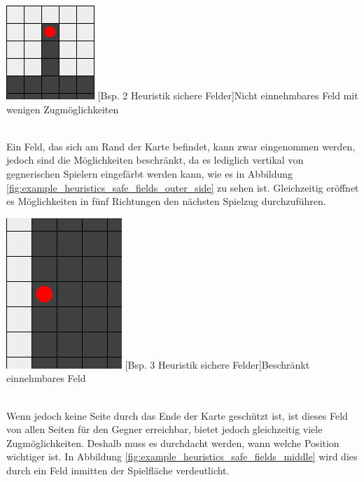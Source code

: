 \documentclass[12pt,a4paper,bibliography=totocnumbered,listof=totocnumbered]{article}
\begin{document}
\vspace{1em}
\begin{minipage}{\linewidth}
	\centering
	\includegraphics[width=0.3\linewidth]{pics/heuristics_safe_fields_dead_end.png}
	[Bsp. 2 Heuristik sichere Felder]{Nicht einnehmbares Feld mit wenigen Zugmöglichkeiten}
	\label{fig:example_heuristics_safe_fields_dead_end}
\end{minipage}
\\

Ein Feld, das sich am Rand der Karte befindet, kann zwar eingenommen werden, jedoch sind die Möglichkeiten beschränkt, da es lediglich vertikal von gegnerischen Spielern eingefärbt werden kann, wie es in Abbildung \ref{fig:example_heuristics_safe_fields_outer_side} zu sehen ist. Gleichzeitig eröffnet es Möglichkeiten in fünf Richtungen den nächsten Spielzug durchzuführen.

\vspace{1em}
\begin{minipage}{\linewidth}
	\centering
	\includegraphics[width=0.3\linewidth]{pics/heuristics_safe_fields_outer_side.png}
	[Bsp. 3 Heuristik sichere Felder]{Beschränkt einnehmbares Feld}
	\label{fig:example_heuristics_safe_fields_outer_side}
\end{minipage}
\\

Wenn jedoch keine Seite durch das Ende der Karte geschützt ist, ist dieses Feld von allen Seiten für den Gegner erreichbar, bietet jedoch gleichzeitig viele Zugmöglichkeiten. Deshalb muss es durchdacht werden, wann welche Position wichtiger ist. In Abbildung \ref{fig:example_heuristics_safe_fields_middle} wird dies durch ein Feld inmitten der Spielfläche verdeutlicht.
\end{document}
